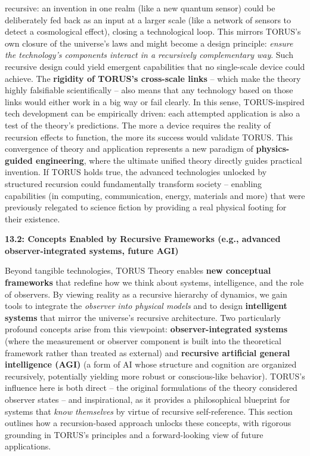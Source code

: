\documentclass[]{article}
\begin{document}
\begin{itemize}
{  recursive}: an invention in one realm (like a new quantum sensor)
  could be deliberately fed back as an input at a larger scale (like a
  network of sensors to detect a cosmological effect), closing a
  technological loop. This mirrors TORUS's own closure of the universe's
  laws and might become a design principle: \emph{ensure the
  technology's components interact in a recursively complementary way}.
  Such recursive design could yield emergent capabilities that no
  single-scale device could achieve. The \textbf{rigidity of TORUS's
  cross-scale links} -- which make the theory highly falsifiable
  scientifically​ -- also means that any technology based on those links
  would either work in a big way or fail clearly. In this sense,
  TORUS-inspired tech development can be empirically driven: each
  attempted application is also a test of the theory's predictions. The
  more a device requires the reality of recursion effects to function,
  the more its success would validate TORUS. This convergence of theory
  and application represents a new paradigm of \textbf{physics-guided
  engineering}, where the ultimate unified theory directly guides
  practical invention. If TORUS holds true, the advanced technologies
  unlocked by structured recursion could fundamentally transform society
  -- enabling capabilities (in computing, communication, energy,
  materials and more) that were previously relegated to science fiction
  by providing a real physical footing for their existence.
\end{itemize}

\textbf{13.2: Concepts Enabled by Recursive Frameworks (e.g., advanced
observer-integrated systems, future AGI)}

Beyond tangible technologies, TORUS Theory enables \textbf{new
conceptual frameworks} that redefine how we think about systems,
intelligence, and the role of observers. By viewing reality as a
recursive hierarchy of dynamics, we gain tools to integrate the
\emph{observer into physical models} and to design \textbf{intelligent
systems} that mirror the universe's recursive architecture. Two
particularly profound concepts arise from this viewpoint:
\textbf{observer-integrated systems} (where the measurement or observer
component is built into the theoretical framework rather than treated as
external) and \textbf{recursive artificial general intelligence (AGI)}
(a form of AI whose structure and cognition are organized recursively,
potentially yielding more robust or conscious-like behavior). TORUS's
influence here is both direct -- the original formulations of the theory
considered observer states -- and inspirational, as it provides a
philosophical blueprint for systems that \emph{know themselves} by
virtue of recursive self-reference. This section outlines how a
recursion-based approach unlocks these concepts, with rigorous grounding
in TORUS's principles and a forward-looking view of future applications.
\end{document}
